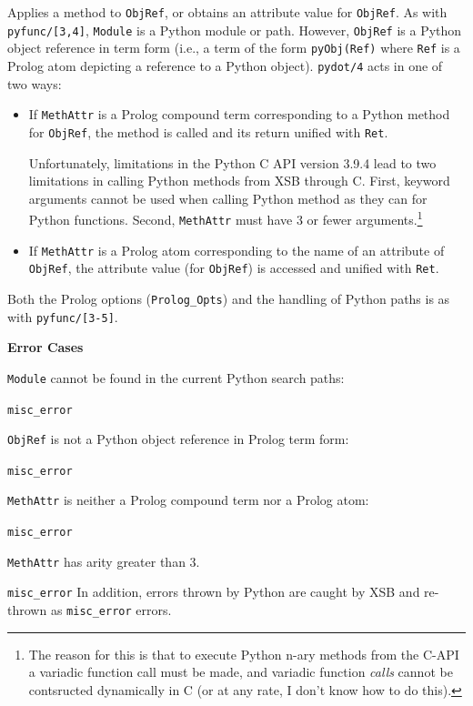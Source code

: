 \begin{description}
%
Applies a method to {\tt ObjRef}, or obtains an attribute value for
\texttt{ObjRef}.  As
with {\tt pyfunc/[3,4]}, {\tt Module} is a Python module or
path. However, {\tt ObjRef} is a Python object reference in term form
(i.e., a term of the form {\tt pyObj(Ref)} where {\tt Ref} is a Prolog
atom depicting a reference to a Python object). {\tt pydot/4} acts in
one of two ways:
\begin{itemize}
\item If {\tt MethAttr} is a Prolog compound term corresponding to a
  Python method for {\tt ObjRef}, the method is called and its return
  unified with {\tt Ret}.

  Unfortunately, limitations in the Python C API version 3.9.4 lead to
  two limitations in calling Python methods from XSB through C.
  First, keyword arguments cannot be used when calling Python method
  as they can for Python functions.  Second, {\tt MethAttr} must have
  3 or fewer arguments.\footnote{The reason for this is that to
    execute Python n-ary methods from the C-API a variadic function
    call must be made, and variadic function {\em calls} cannot be
    contsructed dynamically in C (or at any rate, I don't know how to
    do this).}
%
\item If {\tt MethAttr} is a Prolog atom corresponding to the name of
  an attribute of {\tt ObjRef}, the attribute value (for \texttt{ObjRef})
  is accessed and unified
  with {\tt Ret}.
\end{itemize}

Both the Prolog options ({\tt Prolog\_Opts}) and the handling of Python
paths is as with {\tt pyfunc/[3-5]}.

{\bf Error Cases}
\bi
\item {\tt Module} cannot be found in the current Python search paths:
\bi
\item {\tt misc\_error}
\ei
\item {\tt ObjRef} is not a Python object reference in Prolog term form:
\bi
\item {\tt misc\_error}
\ei
\item {\tt MethAttr} is neither a Prolog compound term nor a Prolog atom:
\bi
\item {\tt misc\_error}
\item {\tt MethAttr} has arity greater than 3.
\bi
\item {\tt misc\_error}
  \ei
  \ei \ei In addition, errors thrown by Python are
  caught by XSB and re-thrown as {\tt misc\_error} errors.


\end{description}
